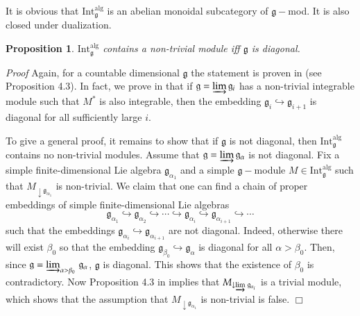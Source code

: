 \documentclass[10pt]{amsart}
\newcounter{theorem}
\newtheorem{prop}[theo]{Proposition}
\renewenvironment{proof}{ \emph{Proof}}{$\Box$}
\renewcommand{\gg}{\mathfrak{g}}
\newcommand{\Int}{\mathrm{Int}}
\newcommand{\alg}{\mathrm{alg}}
\begin{document}
It is obvious that  $\mathrm{Int}_{\gg}^\alg$ is an abelian monoidal subcategory of $\gg-$mod. It is also closed under dualization. 

\begin{prop}\label{alg2}  $\mathrm{Int}_{\gg}^\alg$ contains a non-trivial module iff $\gg$ is diagonal.
\end{prop}
\begin{proof} Again, for a countable dimensional $\gg$ the statement is proven in \cite{ps} (see Proposition 4.3). In fact, we prove in \cite{ps} that if $\gg=\varinjlim \gg_i$ has a non-trivial integrable module such that $M^*$ is also integrable, then the embedding  $\gg_i\hookrightarrow\gg_{i+1}$ is diagonal for all sufficiently large $i$.

To give a general proof, it remains to show that if $\gg$ is not diagonal, then $\Int_{\gg}^\alg$ contains no non-trivial modules. Assume that $\gg=\varinjlim \gg_{\alpha}$ is not diagonal. Fix a simple finite-dimensional Lie algebra $\gg_{\alpha_1}$ and a simple $\gg-$module $M \in \mathrm{Int}_{\gg}^\alg$ such that $M_{\downarrow \gg_{\alpha_1}}$ is non-trivial. We claim that one can find a chain of proper embeddings of simple finite-dimensional Lie algebras $$\gg_{\alpha_1} \hookrightarrow \gg_{\alpha_2} \hookrightarrow \cdots \hookrightarrow \gg_{\alpha_i} \hookrightarrow \gg_{\alpha_{i+1}} \hookrightarrow \cdots$$ such that the embeddings $\gg_{\alpha_i} \hookrightarrow \gg_{\alpha_{i+1}}$ are not diagonal. Indeed, otherwise there will exist $\beta_0$ so that the embedding $\gg_{\beta_0} \hookrightarrow \gg_{\alpha}$ is diagonal for all $\alpha > \beta_0$. Then, since $\gg = \varinjlim_{\alpha > \beta_0}\,\gg_{\alpha}$, $\gg$ is diagonal. This shows that the existence of $\beta_0$ is contradictory. 
Now Proposition 4.3 in \cite{ps} implies that $M_{\downarrow\varinjlim\,\gg_{\alpha_i}}$ is a trivial 
module, which shows that the assumption that $M_{\downarrow\gg_{\alpha_1}}$ is non-trivial is false.
% 
\end{proof}
\end{document}
